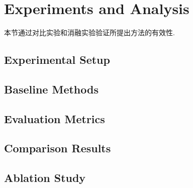 





\section{Experiments and Analysis}

本节通过对比实验和消融实验验证所提出方法的有效性.

\subsection{Experimental Setup}


\subsection{Baseline Methods}


\subsection{Evaluation Metrics}


\subsection{Comparison Results}


\subsection{Ablation Study}

